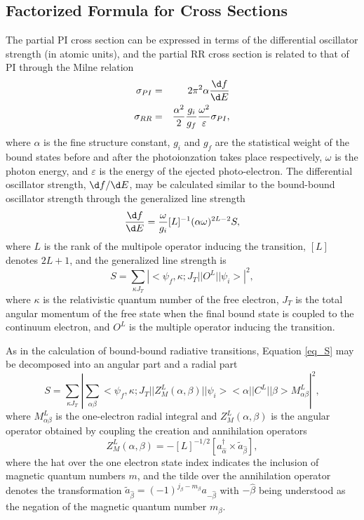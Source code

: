 \documentclass{elsart}
\begin{document}
\subsection{Factorized Formula for Cross Sections}
The partial PI cross section can be expressed in terms of the differential
oscillator strength (in atomic units), and the partial RR cross section is
related to that of PI through the Milne relation
\begin{eqnarray}
\sigma_{PI} &=& 2\pi^2\alpha\frac{\d f}{\d E} \nonumber\\
\sigma_{RR} &=& \frac{\alpha^2}{2}\frac{g_i}{g_f}\frac{\omega^2}{\varepsilon}
\sigma_{PI},
\end{eqnarray}
where $\alpha$ is the fine structure constant, $g_i$ and $g_f$ are the
statistical weight of the bound states before and after the photoionzation
takes place respectively, $\omega$ is the photon energy, and $\varepsilon$ is
the energy of the ejected photo-electron. 
The differential oscillator
strength, $\d f/\d E$, may be calculated similar to the bound-bound oscillator
strength through the generalized line strength
\begin{equation}
\frac{\d f}{\d E} = \frac{\omega}{g_i}[L]^{-1}(\alpha\omega)^{2L-2}S,
\end{equation}
where $L$ is the rank of the multipole operator inducing the transition,
$[L]$ denotes $2L+1$, and the generalized line strength is 
\begin{equation}
\label{eq_S}
S = \sum_{\kappa J_T}\left|<\psi_f,\kappa;J_T||O^L||\psi_i>\right|^2,
\end{equation}
where $\kappa$ is the relativistic quantum number of the free electron, $J_T$
is the total angular momentum of the free state when the final bound state is
coupled to the continuum electron, and $O^L$ is the multiple operator
inducing the transition.

As in the calculation of bound-bound radiative transitions,
Equation \ref{eq_S} may be decomposed into an angular part and a radial part
\begin{equation}
\label{eq_Sf}
S = \sum_{\kappa J_T}\left|\sum_{\alpha\beta}
<\psi_f,\kappa;J_T||Z^L_M(\alpha,\beta)||\psi_i><\alpha||C^L||\beta>
M^L_{\alpha\beta}\right|^2,
\end{equation}
where $M^L_{\alpha\beta}$ is the one-electron radial integral and
$Z^L_M(\alpha,\beta)$ is the angular operator obtained by coupling the
creation and annihilation operators
\begin{equation}
Z^L_M(\alpha,\beta) = -[L]^{-1/2}\left[a^{\dagger}_{\hat{\alpha}}\times
\tilde{a}_{\hat{\beta}}\right],
\end{equation}
where the hat over the one electron state index indicates the inclusion of
magnetic quantum numbers $m$, and the tilde over the annihilation operator
denotes the transformation $\tilde{a}_{\hat{\beta}} = (-1)^{j_\beta -
m_\beta}a_{-\hat{\beta}}$ with $-\hat{\beta}$ being understood as the negation
of the magnetic quantum number $m_\beta$. 
\end{document}
